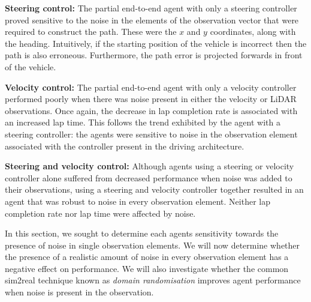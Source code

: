 \textbf{Steering control:}
The partial end-to-end agent with only a steering controller proved sensitive to the noise in the elements of the observation vector that were required to construct the path.
These were the $x$ and $y$ coordinates, along with the heading.
Intuitively, if the starting position of the vehicle is incorrect then the path is also erroneous.
Furthermore, the path error is projected forwards in front of the vehicle.


%     

\textbf{Velocity control:}
The partial end-to-end agent with only a velocity controller performed poorly when there was noise present in either the velocity or LiDAR observations.
Once again, the decrease in lap completion rate is associated with an increased lap time.
This follows the trend exhibited by the agent with a steering controller: the agents were sensitive to noise in the observation element associated with the controller present in the driving architecture.

\textbf{Steering and velocity control:}
Although agents using a steering or velocity controller alone suffered from decreased performance when noise was added to their observations,
using a steering and velocity controller together resulted in an agent that was robust to noise in every observation element.
Neither lap completion rate nor lap time were affected by noise.

In this section, we sought to determine each agents sensitivity towards the presence of noise in single observation elements.
We will now determine whether the presence of a realistic amount of noise in every observation element has a negative effect on performance.
We will also investigate whether the common sim2real technique known as \emph{domain randomisation} improves agent performance when noise is present in the observation.


